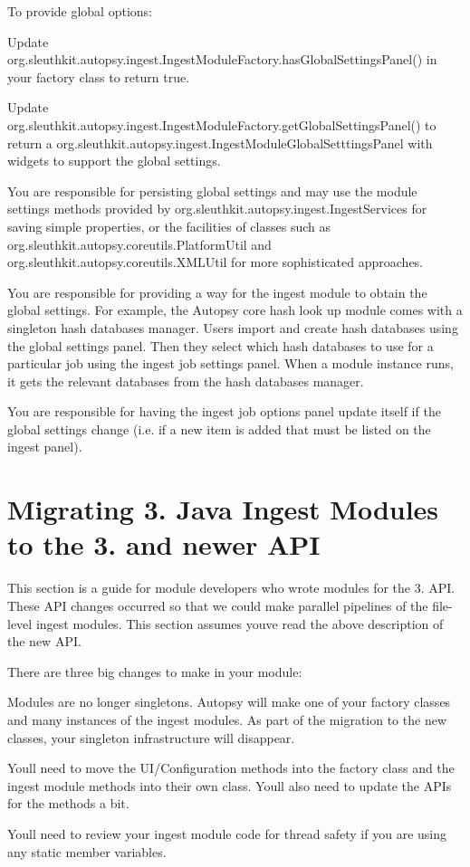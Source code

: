To provide global options\+:
\begin{DoxyItemize}
\item Update org.\+sleuthkit.\+autopsy.\+ingest.\+Ingest\+Module\+Factory.\+has\+Global\+Settings\+Panel() in your factory class to return true.
\item Update org.\+sleuthkit.\+autopsy.\+ingest.\+Ingest\+Module\+Factory.\+get\+Global\+Settings\+Panel() to return a org.\+sleuthkit.\+autopsy.\+ingest.\+Ingest\+Module\+Global\+Setttings\+Panel with widgets to support the global settings.
\item You are responsible for persisting global settings and may use the module settings methods provided by org.\+sleuthkit.\+autopsy.\+ingest.\+Ingest\+Services for saving simple properties, or the facilities of classes such as org.\+sleuthkit.\+autopsy.\+coreutils.\+Platform\+Util and org.\+sleuthkit.\+autopsy.\+coreutils.\+X\+M\+L\+Util for more sophisticated approaches.
\item You are responsible for providing a way for the ingest module to obtain the global settings. For example, the Autopsy core hash look up module comes with a singleton hash databases manager. Users import and create hash databases using the global settings panel. Then they select which hash databases to use for a particular job using the ingest job settings panel. When a module instance runs, it gets the relevant databases from the hash databases manager.
\item You are responsible for having the ingest job options panel update itself if the global settings change (i.\+e. if a new item is added that must be listed on the ingest panel).
\end{DoxyItemize}\hypertarget{mod_ingest_page_ingest_modules_api_migration}{}\section{Migrating 3. Java Ingest Modules to the 3. and newer A\+PI}\label{mod_ingest_page_ingest_modules_api_migration}
This section is a guide for module developers who wrote modules for the 3. A\+PI. These A\+PI changes occurred so that we could make parallel pipelines of the file-\/level ingest modules. This section assumes you\textquotesingle{}ve read the above description of the new A\+PI.

There are three big changes to make in your module\+:
\begin{DoxyEnumerate}
\item Modules are no longer singletons. Autopsy will make one of your factory classes and many instances of the ingest modules. As part of the migration to the new classes, your singleton infrastructure will disappear.
\item You\textquotesingle{}ll need to move the U\+I/\+Configuration methods into the factory class and the ingest module methods into their own class. You\textquotesingle{}ll also need to update the A\+P\+Is for the methods a bit.
\item You\textquotesingle{}ll need to review your ingest module code for thread safety if you are using any static member variables.
\end{DoxyEnumerate}

